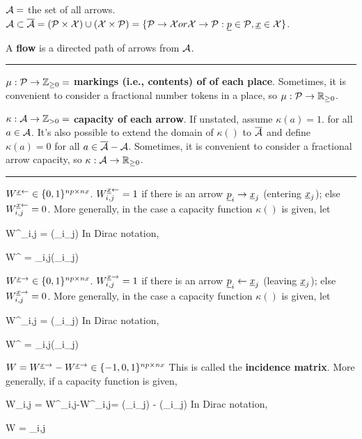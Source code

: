 ${\cal A} =$  the set of all arrows. $\cala \subset \ol {\cala} = (\calp \times \calx) \cup (\calx \times \calp) = \{\calp\rarrow\calx or \calx \rarrow \calp:
\rvp\in\calp, \rvx \in \calx\}$.


A {\bf flow} is a directed path of arrows from ${\cal A}$.

\hrule
$\mu : {\cal P} \rightarrow {\mathbb{Z}}_{\geq 0}=$ {\bf markings (i.e., contents) of of each place}. Sometimes, it is convenient to consider a fractional number tokens in a place, so
$\mu : {\cal P} \rightarrow { \mathbb{R}}_{\geq 0}$.



$\kappa : {\cal A}\rightarrow {\mathbb{Z}}_{>0}=$ {\bf capacity of each arrow}. If unstated, assume $\kappa(a) = 1$.
for all $a\in{\cal A}$. It's also possible to extend the domain of 
$\kappa()$ to $\overline{{\cal A}}$ and define $\kappa(a) = 0$
for all $a\in \overline{{\cal A}}-{\cal A}$. Sometimes, it is convenient to consider a fractional arrow capacity, so
$\kappa : {\cal A} \rightarrow { \mathbb{R}}_{\geq 0}$.

\hrule
$W^{\rvx \larrow} \in \bool^{np\times nx}$. 
$W^{\rvx \larrow}_{i,j} = 1$ if there is an arrow $\rvp_i\rarrow\rvx_j$
(entering $\rvx_j$);
else $W^{\rvx \larrow}_{i,j} = 0$. More generally, in the case a capacity function $\kappa()$ is given, let

\beq
W^{\rvx \larrow}_{i,j} = \kappa(\rvp_i\rarrow \rvx_j)
\eeq
In Dirac notation, 

\beq
W^{\rvx \larrow} = \sum_{i,j}\kappa(\rvp_i\rarrow \rvx_j)
\eeq


$W^{\rvx \rarrow} \in \bool^{np\times nx}$. 
$W^{\rvx \rarrow}_{i,j} = 1$ if there is an arrow $\rvp_i\larrow\rvx_j$
(leaving $\rvx_j$);
else $W^{\rvx \rarrow}_{i,j} = 0$. More generally, in the case a capacity function $\kappa()$ is given, let

\beq
W^{\rvx \rarrow}_{i,j} = \kappa(\rvp_i\larrow \rvx_j)
\eeq
In Dirac notation, 

\beq
W^{\rvx \rarrow} = \sum_{i,j}\kappa(\rvp_i\larrow \rvx_j)
\eeq

$W =W^{\rvx \rarrow}-W^{\rvx \rarrow}\in \{-1, 0, 1\}^{np\times nx}$ This is called the {\bf incidence matrix}.
More generally, if a capacity function is given, 

\beq
W_{i,j} =
 W^{\rvx \rarrow}_{i,j}-W^{\rvx \larrow}_{i,j}=
\kappa(\rvp_i\larrow \rvx_j)
-
\kappa(\rvp_i\rarrow \rvx_j)
\eeq
In Dirac notation, 

\beq
W =  \sum_{i,j}
\eeq

